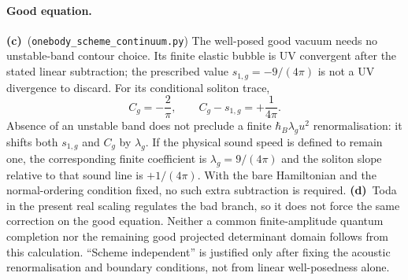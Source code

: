 \documentclass[11pt,a4paper]{article}
\newcommand{\Lc}{\textbf{(c)}\ }
\newcommand{\Ld}{\textbf{(d)}\ }
\newcommand{\ccheck}{\texttt{onebody\_\allowbreak scheme\_\allowbreak continuum.py}}
\begin{document}
\paragraph{Good equation.}
\Lc (\ccheck) The well-posed good vacuum needs no unstable-band contour
choice. Its finite elastic bubble is UV convergent after the stated linear
subtraction; the prescribed value $s_{1,g}=-9/(4\pi)$ is not a UV divergence
to discard. For its conditional soliton trace,
\begin{equation}
 C_g=-\frac2\pi,\qquad C_g-s_{1,g}=+\frac1{4\pi}.
\end{equation}
Absence of an unstable band does not preclude a finite $\hbar_B\lambda_g u^2$
renormalisation: it shifts both $s_{1,g}$ and $C_g$ by $\lambda_g$.
If the physical sound speed is defined to remain one, the corresponding
finite coefficient is $\lambda_g=9/(4\pi)$ and the soliton slope relative
to that sound line is $+1/(4\pi)$. With the bare Hamiltonian and the
normal-ordering condition fixed, no such extra subtraction is required.
\Ld Toda in the present real scaling regulates the bad branch, so it
does not force the same correction on the good equation. Neither a common
finite-amplitude quantum completion nor the remaining good projected
determinant domain follows from this calculation. ``Scheme independent''
is justified only after fixing the acoustic renormalisation and boundary
conditions, not from linear well-posedness alone.
\end{document}
